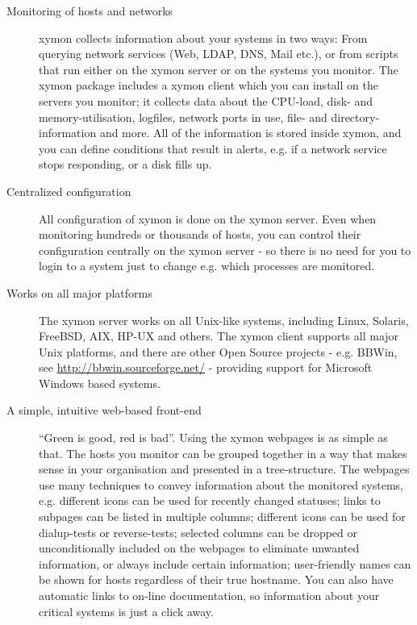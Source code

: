 \begin{description}

\item[Monitoring of hosts and networks] xymon collects information
  about your systems in two ways: From querying network services (Web,
  LDAP, DNS, Mail etc.), or from scripts that run either on the xymon
  server or on the systems you monitor. The xymon package includes a
  xymon client which you can install on the servers you monitor; it
  collects data about the CPU-load, disk- and memory-utilisation,
  logfiles, network ports in use, file- and directory-information and
  more. All of the information is stored inside xymon, and you can
  define conditions that result in alerts, e.g. if a network service
  stops responding, or a disk fills up. 

\item[Centralized configuration] All configuration of xymon is done
  on the xymon server. Even when monitoring hundreds or thousands of
  hosts, you can control their configuration centrally on the xymon
  server - so there is no need for you to login to a system just to
  change e.g. which processes are monitored. 

\item[Works on all major platforms] The xymon server works on all
  Unix-like systems, including Linux, Solaris, FreeBSD, AIX, HP-UX and
  others. The xymon client supports all major Unix platforms, and
  there are other Open Source projects - e.g. BBWin, see
  \url{http://bbwin.sourceforge.net/} - providing support for
  Microsoft Windows based systems. 

\item[A simple, intuitive web-based front-end] ``Green is good, red is
  bad''. Using the xymon webpages is as simple as that. The hosts you
  monitor can be grouped together in a way that makes sense in your
  organisation and presented in a tree-structure. The webpages use
  many techniques to convey information about the monitored systems,
  e.g. different icons can be used for recently changed statuses;
  links to subpages can be listed in multiple columns; different icons
  can be used for dialup-tests or reverse-tests; selected columns can
  be dropped or unconditionally included on the webpages to eliminate
  unwanted information, or always include certain information;
  user-friendly names can be shown for hosts regardless of their true
  hostname. You can also have automatic links to on-line
  documentation, so information about your critical systems is just a
  click away. 


\end{description}
